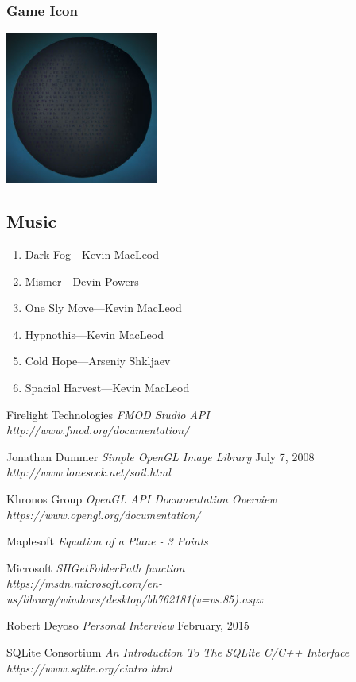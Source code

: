 \documentclass{article}
\begin{document}
\subsubsection{Game Icon}
	\includegraphics[width=5cm]{../Resources/Images/Core}
	
\subsection{Music}

\begin{enumerate}
	\item Dark Fog---Kevin MacLeod
	\item Mismer---Devin Powers
	\item One Sly Move---Kevin MacLeod
	\item Hypnothis---Kevin MacLeod
	\item Cold Hope---Arseniy Shkljaev
	\item Spacial Harvest---Kevin MacLeod
\end{enumerate}

\pagebreak
\begin{thebibliography}{9}

Firelight Technologies 
\textit{FMOD Studio API} \\
\textit{http://www.fmod.org/documentation/}

Jonathan Dummer
\textit{Simple OpenGL Image Library} July 7, 2008 \\
\textit{http://www.lonesock.net/soil.html}
	
Khronos Group
\textit{OpenGL API Documentation Overview} \\
\textit{https://www.opengl.org/documentation/}

Maplesoft
\textit{Equation of a Plane - 3 Points}

Microsoft
\textit{SHGetFolderPath function} \\
\textit{https://msdn.microsoft.com/en-us/library/windows/desktop/bb762181(v=vs.85).aspx}

Robert Deyoso
\textit{Personal Interview} February, 2015

SQLite Consortium
\textit{An Introduction To The SQLite C/C++ Interface} \\
\textit{https://www.sqlite.org/cintro.html}

\end{thebibliography}
\end{document}
